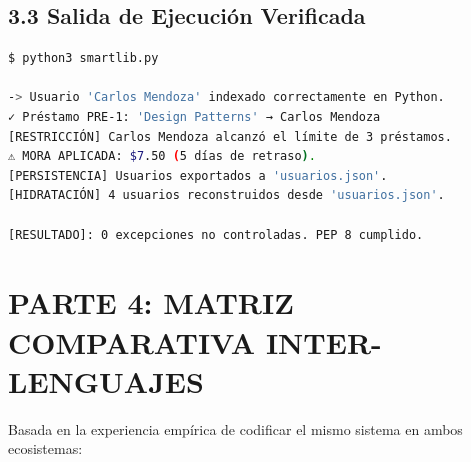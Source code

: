 \documentclass[12pt,a4paper]{article}
\begin{document}
\subsection{3.3 Salida de Ejecución Verificada}
\begin{lstlisting}[language=bash]
$ python3 smartlib.py

-> Usuario 'Carlos Mendoza' indexado correctamente en Python.
✓ Préstamo PRE-1: 'Design Patterns' → Carlos Mendoza
[RESTRICCIÓN] Carlos Mendoza alcanzó el límite de 3 préstamos.
⚠ MORA APLICADA: $7.50 (5 días de retraso).
[PERSISTENCIA] Usuarios exportados a 'usuarios.json'.
[HIDRATACIÓN] 4 usuarios reconstruidos desde 'usuarios.json'.

[RESULTADO]: 0 excepciones no controladas. PEP 8 cumplido.
\end{lstlisting}

\section{PARTE 4: MATRIZ COMPARATIVA INTER-LENGUAJES}
Basada en la experiencia empírica de codificar el mismo sistema en ambos ecosistemas:
\end{document}
